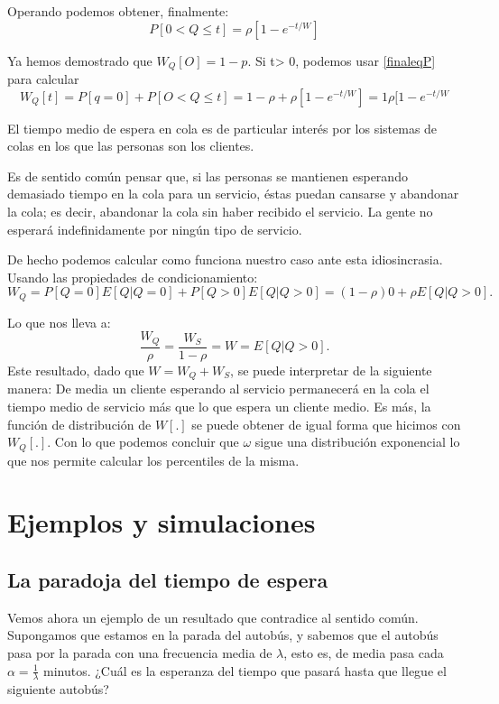 \documentclass[a4paper,10pt]{scrartcl}
\theoremstyle{definition}
\numberwithin{equation}{section}
\begin{document}
	Operando podemos obtener, finalmente:
	\begin{equation*}
	P[0 < Q\le t]=\rho[1-e^{-t/W}]
	\label{finaleqP}
	\end{equation*}
	
	
	Ya hemos demostrado que $W_Q [O] = 1 - p$. Si t> 0, podemos usar \ref{finaleqP} para calcular 
	\[W_Q [t]=P [q = 0] + P [O < Q \leq t]= 1 - \rho + \rho [1 - e^{- t / W}]=1\rho[1-e^{-t/W}\]
	
	El tiempo medio de espera en cola es de particular interés por los sistemas de colas en los que las personas 
	son los clientes.
	
	Es de sentido común pensar que, si las personas se mantienen esperando demasiado tiempo en la cola 
	para un servicio, éstas puedan cansarse y abandonar la cola; es decir, abandonar la cola sin haber 
	recibido el servicio. La gente no esperará indefinidamente por ningún tipo de servicio.
	
	De hecho podemos calcular como funciona nuestro caso ante esta idiosincrasia. Usando las propiedades de condicionamiento:
	\begin{equation*}
	W_Q = P [Q = 0] E [Q|Q = 0] + P [Q > 0]E [Q|Q> 0] = (1 - \rho)  0 + \rho E [Q|Q> 0].
	\end{equation*}
	
	Lo que nos lleva a:
	\begin{equation*}
	\frac{W_Q}{\rho}=\frac{W_S}{1-\rho}=W= E [Q|Q> 0].
	\end{equation*}
	Este resultado, dado que $W=W_Q + W_S$, se puede interpretar de la siguiente manera: De media un cliente 
	esperando al servicio permanecerá en la cola el tiempo medio de servicio más que lo que espera un cliente medio.
	Es más, la función de distribución de $W[.]$ se puede obtener de igual forma que hicimos con $W_Q[.]$. Con lo
	que podemos concluir que $\omega$ sigue una distribución exponencial lo que nos permite calcular los percentiles
	de la misma.
	
	\section{Ejemplos y simulaciones}
	\subsection{La paradoja del tiempo de espera}
	Vemos ahora un ejemplo de un resultado que contradice al sentido común. Supongamos que estamos en la parada del autobús, y sabemos que el autobús pasa por la parada con una frecuencia media de $\lambda$, esto es, de media pasa cada $\alpha=\frac{1}{\lambda}$ minutos. ¿Cuál es la esperanza del tiempo que pasará hasta que llegue el siguiente autobús?
	
\end{document}
